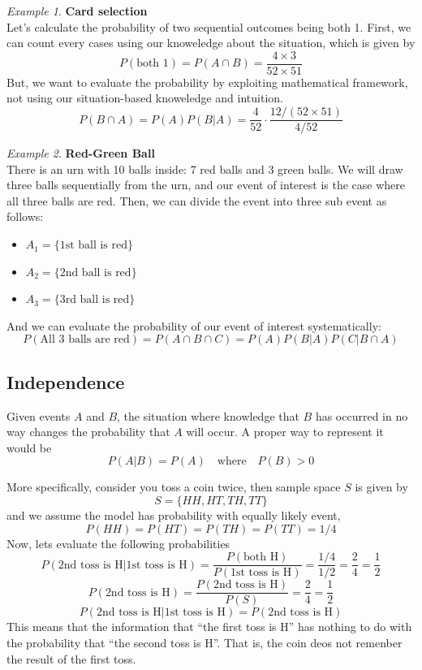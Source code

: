 \documentclass[twoside]{article}
\newcounter{lecnum}
\theoremstyle{definition}
\theoremstyle{remark}
\newtheorem{example}{Example}[lecnum]
\begin{document}
\begin{example}{\bf Card selection} \\
  Let's calculate the probability of two sequential outcomes being both 1.
  First, we can count every cases using our knoweledge about the situation,
  which is given by
  $$
  P(\textrm{both 1}) = P(A \cap B) = \frac{4 \times 3}{52 \times 51}
  $$
  But, we want to evaluate the probability by exploiting mathematical framework,
  not using our situation-based knoweledge and intuition.
  $$
  P(B \cap A) = P(A) P(B|A) = \frac{4}{52} \cdot  \frac{12 / (52 \times 51)}{4 / 52}
  $$
\end{example}

\begin{example}{\bf Red-Green Ball} \\
  There is an urn with 10 balls inside: 7 red balls and 3 green balls. We will
  draw three balls sequentially from the urn, and our event of interest is the
  case where all three balls are red. Then, we can divide the event into three
  sub event as follows:
  \begin{itemize}
    \item $A_1 = \{\textrm{1st ball is red}\}$
    \item $A_2 = \{\textrm{2nd ball is red}\}$
    \item $A_3 = \{\textrm{3rd ball is red}\}$
  \end{itemize}
  And we can evaluate the probability of our event of interest systematically:
  $$
  P(\textrm{All 3 balls are red}) = P(A \cap B \cap C) = P(A) P(B|A) P(C|B \cap A)
  $$
\end{example}

\clearpage
\subsection{Independence}
Given events $A$ and $B$, the situation where knowledge that $B$ has occurred in
no way changes the probability that $A$ will occur. A proper way to represent it
would be
\begin{equation}
  P(A|B) = P(A) \quad \textrm{where} \quad P(B) > 0
\end{equation}

More specifically, consider you toss a coin twice, then sample space $S$ is given by
$$
S = \{ HH, HT, TH, TT \}
$$
and we assume the model has probability with equally likely event,
$$
P(HH) = P(HT) = P(TH) = P(TT) = 1/4
$$
Now, lets evaluate the following probabilities
$$
P(\textrm{2nd toss is H} | \textrm{1st toss is H})
= \frac{P(\textrm{both H})}{P(\textrm{1st toss is H})}
= \frac{1/4}{1/2} = \frac{2}{4} = \frac{1}{2}
$$
$$
P(\textrm{2nd toss is H}) = \frac{P(\textrm{2nd toss is H})}{P(S)}
= \frac{2}{4} = \frac{1}{2}
$$
$$
P(\textrm{2nd toss is H} | \textrm{1st toss is H}) = P(\textrm{2nd toss is H})
$$
This means that the information that ``the first toss is H'' has nothing to do with
the probability that ``the second toss is H''. That is, the coin deos not remenber
the result of the first toss.
\end{document}
